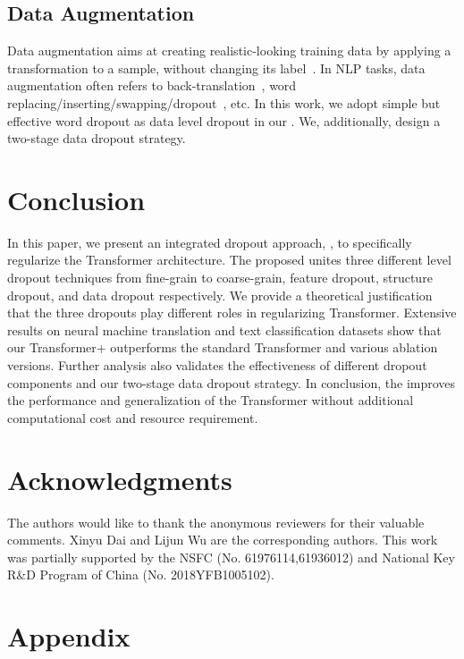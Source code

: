 \documentclass[11pt]{article}
\begin{document}
\subsection{Data Augmentation}
Data augmentation aims at creating realistic-looking training data by applying a transformation to a sample, without changing its label~\cite{xie2020unsupervised}. In NLP tasks, data augmentation often refers to back-translation~\cite{sennrich2016improving}, word replacing/inserting/swapping/dropout~\cite{DBLP:conf/emnlp/WeiZ19,xie2020unsupervised}, etc. In this work, we adopt simple but effective word dropout as data level dropout in our . We, additionally, design a two-stage data dropout strategy.


\section{Conclusion}
In this paper, we present an integrated dropout approach, , to specifically regularize the Transformer architecture. The proposed  unites three different level dropout techniques from fine-grain to coarse-grain, feature dropout, structure dropout, and data dropout respectively. We provide a theoretical justification that the three dropouts play different roles in regularizing Transformer. Extensive results on neural machine translation and text classification datasets show that our Transformer+ outperforms the standard Transformer and various ablation versions. Further analysis also validates the effectiveness of different dropout components and our two-stage data dropout strategy. In conclusion, the  improves the performance and generalization of the Transformer without additional computational cost and resource requirement.


\section*{Acknowledgments}
The authors would like to thank the anonymous reviewers for their valuable comments. Xinyu Dai and Lijun Wu are the corresponding authors. This work was partially supported by the NSFC (No. 61976114,61936012) and National Key R\&D Program of China (No. 2018YFB1005102).







\clearpage
\appendix

\section{Appendix}
\end{document}
